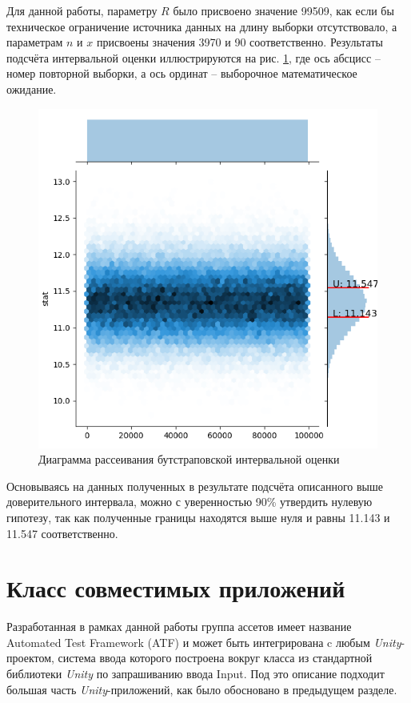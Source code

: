 Для данной работы, параметру $R$ было присвоено значение 99509, как если бы техническое ограничение источника данных на длину выборки отсутствовало, а параметрам $n$ и $x$ присвоены значения 3970 и 90 соответственно. Результаты подсчёта интервальной оценки иллюстрируются на рис. \ref{experiment}, где ось абсцисс -- номер повторной выборки, а ось ординат -- выборочное математическое ожидание.

\begin{figure}[H]
	\centering
	\includegraphics[width=\linewidth]{experiment.png}
	\caption{Диаграмма рассеивания бутстраповской интервальной оценки}
	\label{experiment}
\end{figure}

Основываясь на данных полученных в результате подсчёта описанного выше доверительного интервала, можно с уверенностью 90\% утвердить нулевую гипотезу, так как полученные границы находятся выше нуля и равны 11.143 и 11.547 соответственно.

\section{Класс совместимых приложений}
Разработанная в рамках данной работы группа ассетов имеет название Automated Test Framework (ATF) и может быть интегрирована c любым \textit{Unity}-проектом, система ввода которого построена вокруг класса из стандартной библиотеки \textit{Unity} по запрашиванию ввода Input. Под это описание подходит большая часть \textit{Unity}-приложений, как было обосновано в предыдущем разделе.

